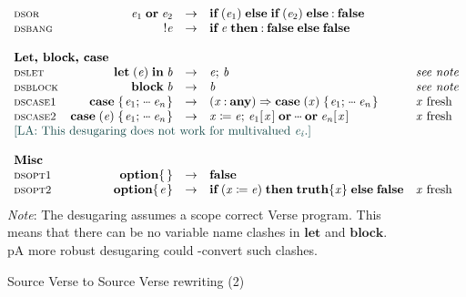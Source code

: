 \begin{figure}
$$\begin{array}{lrcll}
\rulename{dsor}  &   \ensuremath{\Varid{e}_{\mathrm{1}}\;\textbf{or}\;\Varid{e}_{\mathrm{2}}} & \rightarrow & \ensuremath{\textbf{if}\;(\Varid{e}_{\mathrm{1}})\;\textbf{else}\;\textbf{if}\;(\Varid{e}_{\mathrm{2}})\;\textbf{else}\mathbin{:}\textbf{false}} \\
\rulename{dsbang} &   \ensuremath{\mathbin{!}\Varid{e}} & \rightarrow & \ensuremath{\textbf{if}\;\Varid{e}\;\textbf{then}\mathbin{:}\textbf{false}\;\textbf{else}\;\textbf{false}} \\
  \\
  \multicolumn{5}{l}{\textbf{Let, block, case}} \\
\rulename{dslet}   &    \ensuremath{\mathbf{let}\;(\Varid{e})\;\textbf{in}\;\Varid{b}} & \rightarrow & \ensuremath{\Varid{e};\,\Varid{b}} & \textit{see note} \\
\rulename{dsblock} &    \ensuremath{\textbf{block}\;\Varid{b}} & \rightarrow & \ensuremath{\Varid{b}} & \textit{see note}  \\
\rulename{dscase1} &    \ensuremath{\textbf{case}\;\{\mskip1.5mu \Varid{e}_{\mathrm{1}};\,\mydots\;\Varid{e}_{\Varid{n}}\mskip1.5mu\}} & \rightarrow & \ensuremath{(\Varid{x}\mathbin{:}\textbf{any})\Rightarrow \textbf{case}\;(\Varid{x})\;\{\mskip1.5mu \Varid{e}_{\mathrm{1}};\,\mydots\;\Varid{e}_{\Varid{n}}\mskip1.5mu\}} & \text{\ensuremath{\Varid{x}} fresh} \\
\rulename{dscase2} &    \ensuremath{\textbf{case}\;(\Varid{e})\;\{\mskip1.5mu \Varid{e}_{\mathrm{1}};\,\mydots\;\Varid{e}_{\Varid{n}}\mskip1.5mu\}} & \rightarrow & \ensuremath{\Varid{x}\mathrel{\coloneqq}\Varid{e};\,\Varid{e}_{\mathrm{1}} [\mskip1.5mu \Varid{x}\mskip1.5mu]\;\textbf{or}\;\mydots\;\textbf{or}\;\Varid{e}_{\Varid{n}} [\mskip1.5mu \Varid{x}\mskip1.5mu]} & \text{\ensuremath{\Varid{x}} fresh} \\
  \multicolumn{5}{l}{\lennart{This desugaring does not work for multivalued \ensuremath{\Varid{e}_{\Varid{i}}}.}} \\
  \\
  \multicolumn{5}{l}{\textbf{Misc}} \\
\rulename{dsopt1} &   \ensuremath{\textbf{option} \{\mskip1.5mu \mskip1.5mu\}} & \rightarrow & \ensuremath{\textbf{false}} \\
\rulename{dsopt2} &   \ensuremath{\textbf{option} \{\mskip1.5mu \Varid{e}\mskip1.5mu\}} & \rightarrow & \ensuremath{\textbf{if}\;(\Varid{x}\mathrel{\coloneqq}\Varid{e})\;\textbf{then}\;\textbf{truth}\{\Varid{x}\}\;\textbf{else}\;\textbf{false}} & \text{\ensuremath{\Varid{x}} fresh} \\
\end{array}
$$
{\em Note}: The desugaring assumes a scope correct Verse program.
This means that there can be no variable name clashes in \ensuremath{\mathbf{let}} and \ensuremath{\textbf{block}}.
pA more robust desugaring could \textalpha-convert such clashes.
\caption{Source Verse to Source Verse rewriting (2)} \label{fig:sv-to-sv-2}
\end{figure}
